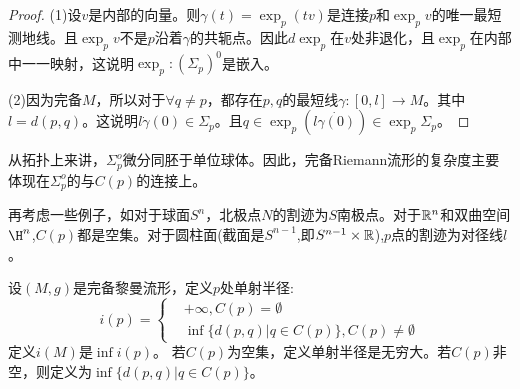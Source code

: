 \begin{proof}
    (1)设$v$是内部的向量。则$\gamma(t)=\exp_p(tv)$是连接$p$和$\exp_p v$的唯一最短测地线。且$\exp_p v$不是$p$沿着$\gamma$的共轭点。因此$d\exp_p$在$v$处非退化，且$\exp_p$在内部中一一映射，这说明$\exp_p:(\Sigma_p)^0$是嵌入。

    (2)因为完备$M$，所以对于$\forall q\neq p$，都存在$p,q$的最短线$\gamma:[0,l] \to M$。其中$l=d(p,q)$。这说明$l \dot{\gamma}(0)\in \Sigma_p$。且$q \in \exp_p(l\dot{\gamma(0)})\in \exp_p \Sigma_p$。
\end{proof}

\begin{remark}
    从拓扑上来讲，$\Sigma_p^o$微分同胚于单位球体。因此，完备Riemann流形的复杂度主要体现在$\Sigma_p^o$的与$C(p)$的连接上。
\end{remark}
再考虑一些例子，如对于球面$S^n$，北极点$N$的割迹为$S$南极点。对于$\mathbb{R}^n$和双曲空间$\H^n$,$C(p)$都是空集。对于圆柱面(截面是$S^{n-1}$,即$S^{n-1}\times \mathbb{R}$),$p$点的割迹为对径线$l$。
\begin{definition}[单射半径]
    设$(M,g)$是完备黎曼流形，定义$p$处单射半径:
    \begin{equation*}
        i(p)=\left \{\begin{aligned}
            &+\infty ,C(p)=\emptyset\\
            &\inf\{d(p,q)|q \in C(p)\},C(p)\neq \emptyset
        \end{aligned}\right.
    \end{equation*}
    定义$i(M)$是$\inf i(p)$。
    若$C(p)$为空集，定义单射半径是无穷大。若$C(p)$非空，则定义为$\inf \{d(p,q)|q\in C(p)\}$。
\end{definition}

